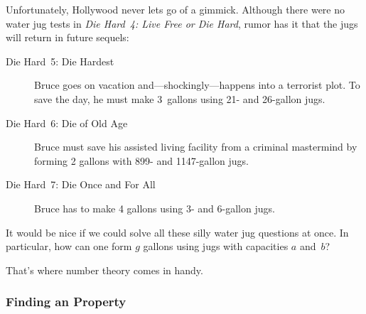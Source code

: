 Unfortunately, Hollywood never lets go of a gimmick.  Although there
were no water jug tests in \emph{Die Hard~4: Live Free or Die Hard},
rumor has it that the
jugs will return in future sequels:
\begin{description}

\item[Die Hard~5: Die Hardest]
Bruce goes on vacation and---shockingly---happens into a terrorist
plot.  To save the day, he must make 3~gallons using 21- and 26-gallon
jugs.

\item[Die Hard~6: Die of Old Age]
Bruce must save his assisted living facility from a criminal
mastermind by forming 2 gallons with 899- and 1147-gallon jugs.

\item[Die Hard~7: Die Once and For All]
Bruce has to make 4 gallons using 3- and 6-gallon jugs.

\end{description}
It would be nice if we could solve all these silly water jug questions
at once.  In particular, how can one form $g$ gallons using jugs with
capacities $a$ and~$b$?

That's where number theory comes in handy.

\subsubsection{Finding an  Property}

